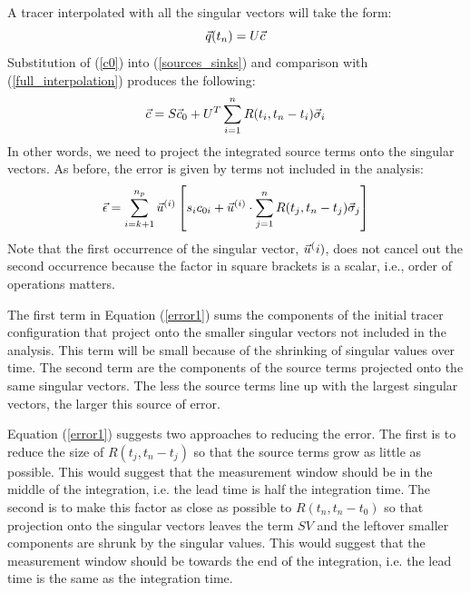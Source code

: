 A tracer interpolated with all the singular vectors will take the form:
\begin{equation}
	\vec q(t_n) = U \vec c
	\label{full_interpolation}
\end{equation}
Substitution of (\ref{c0}) into (\ref{sources_sinks}) and comparison with
(\ref{full_interpolation}) produces
the following:
\begin{equation}
	\vec c = S \vec c_0 + U^T \sum_{i=1}^n R(t_i, t_n-t_i) \vec \sigma_i
\end{equation}
In other words, we need to project the integrated source terms onto the
singular vectors.
As before, the error is given by terms not included in the analysis:
\begin{equation}
	\vec \epsilon = \sum_{i=k+1}^{n_p} \vec u^{(i)} \left [s_i c_{0i}
	+ \vec u^{(i)} \cdot \sum_{j=1}^n R(t_j, t_n-t_j) \vec \sigma_j \right ]
	\label{error1}
\end{equation}
Note that the first occurrence of the singular vector, $\vec u^(i)$, does not
cancel out the second occurrence because the factor in square brackets is a scalar, i.e., order of operations matters.

The first term in Equation (\ref{error1}) sums the components of the initial tracer configuration that project onto the smaller singular vectors not included in the analysis. 
This term will be small because of the shrinking of singular values over time.
The second term are the components of the source terms projected onto the same singular vectors.
The less the source terms line up with the largest singular vectors, the
larger this source of error.

Equation (\ref{error1}) suggests two approaches to reducing the error.
The first is to reduce the size of $R(t_j, t_n-t_j)$ so that the source terms
grow as little as possible.
This would suggest that the measurement window should be in the middle
of the integration, i.e. the lead time is half the integration time.
The second is to make this factor as close as possible to $R(t_n, t_n-t_0)$
so that projection onto the singular vectors leaves the term $SV$ and
the leftover smaller components are shrunk by the singular values.
This would suggest that the measurement window should be towards the end
of the integration, i.e. the lead time is the same as the integration time.

